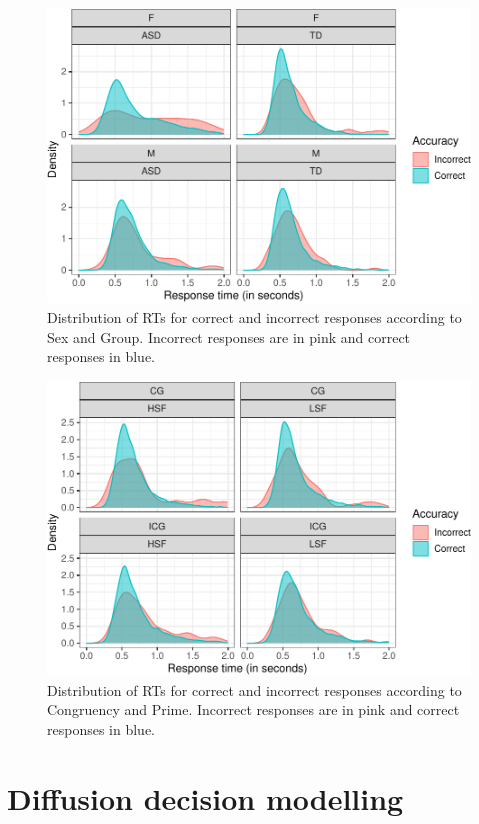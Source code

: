 \documentclass[
  11pt,
  english,
  ,doc,floatsintext]{apa6}
\begin{document}
\begin{figure}[!htb]

{\centering \includegraphics[width=0.75\linewidth]{supplementary_materials_files/figure-latex/correctness1-1} 

}

\caption{Distribution of RTs for correct and incorrect responses according to Sex and Group. Incorrect responses are in pink and correct responses in blue.}\label{fig:correctness1}
\end{figure}

\begin{figure}[!htb]

{\centering \includegraphics[width=0.75\linewidth]{supplementary_materials_files/figure-latex/correctness2-1} 

}

\caption{Distribution of RTs for correct and incorrect responses according to Congruency and Prime. Incorrect responses are in pink and correct responses in blue.}\label{fig:correctness2}
\end{figure}

\newpage

\hypertarget{diffusion-decision-modelling}{%
\section{Diffusion decision modelling}\label{diffusion-decision-modelling}}
\end{document}
